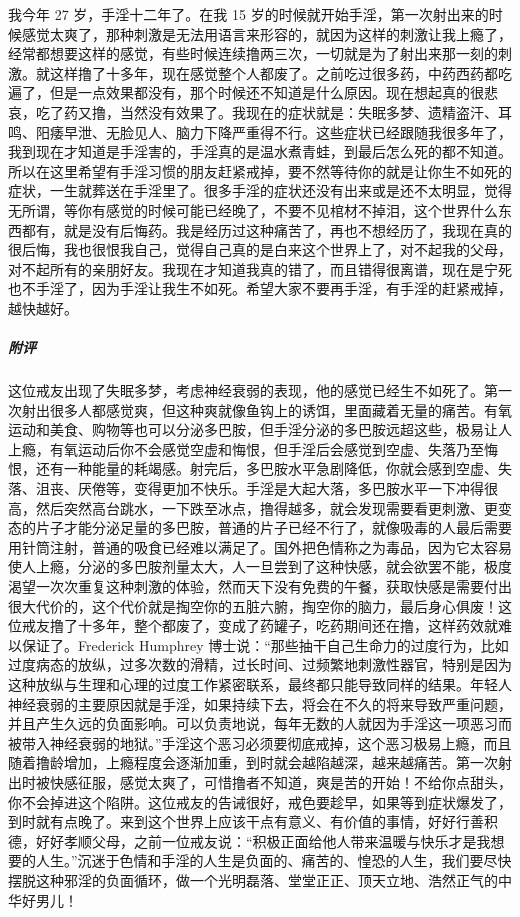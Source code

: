 \begin{case}
    我今年 27 岁，手淫十二年了。在我 15 岁的时候就开始手淫，第一次射出来的时候感觉太爽了，那种刺激是无法用语言来形容的，就因为这样的刺激让我上瘾了，经常都想要这样的感觉，有些时候连续撸两三次，一切就是为了射出来那一刻的刺激。就这样撸了十多年，现在感觉整个人都废了。之前吃过很多药，中药西药都吃遍了，但是一点效果都没有，那个时候还不知道是什么原因。现在想起真的很悲哀，吃了药又撸，当然没有效果了。我现在的症状就是：失眠多梦、遗精盗汗、耳鸣、阳痿早泄、无脸见人、脑力下降严重得不行。这些症状已经跟随我很多年了，我到现在才知道是手淫害的，手淫真的是温水煮青蛙，到最后怎么死的都不知道。所以在这里希望有手淫习惯的朋友赶紧戒掉，要不然等待你的就是让你生不如死的症状，一生就葬送在手淫里了。很多手淫的症状还没有出来或是还不太明显，觉得无所谓，等你有感觉的时候可能已经晚了，不要不见棺材不掉泪，这个世界什么东西都有，就是没有后悔药。我是经历过这种痛苦了，再也不想经历了，我现在真的很后悔，我也很恨我自己，觉得自己真的是白来这个世界上了，对不起我的父母，对不起所有的亲朋好友。我现在才知道我真的错了，而且错得很离谱，现在是宁死也不手淫了，因为手淫让我生不如死。希望大家不要再手淫，有手淫的赶紧戒掉，越快越好。
    \subparagraph{附评} 这位戒友出现了失眠多梦，考虑神经衰弱的表现，他的感觉已经生不如死了。第一次射出很多人都感觉爽，但这种爽就像鱼钩上的诱饵，里面藏着无量的痛苦。有氧运动和美食、购物等也可以分泌多巴胺，但手淫分泌的多巴胺远超这些，极易让人上瘾，有氧运动后你不会感觉空虚和悔恨，但手淫后会感觉到空虚、失落乃至悔恨，还有一种能量的耗竭感。射完后，多巴胺水平急剧降低，你就会感到空虚、失落、沮丧、厌倦等，变得更加不快乐。手淫是大起大落，多巴胺水平一下冲得很高，然后突然高台跳水，一下跌至冰点，撸得越多，就会发现需要看更刺激、更变态的片子才能分泌足量的多巴胺，普通的片子已经不行了，就像吸毒的人最后需要用针筒注射，普通的吸食已经难以满足了。国外把色情称之为毒品，因为它太容易使人上瘾，分泌的多巴胺剂量太大，人一旦尝到了这种快感，就会欲罢不能，极度渴望一次次重复这种刺激的体验，然而天下没有免费的午餐，获取快感是需要付出很大代价的，这个代价就是掏空你的五脏六腑，掏空你的脑力，最后身心俱废！这位戒友撸了十多年，整个都废了，变成了药罐子，吃药期间还在撸，这样药效就难以保证了。Frederick Humphrey 博士说：“那些抽干自己生命力的过度行为，比如过度病态的放纵，过多次数的滑精，过长时间、过频繁地刺激性器官，特别是因为这种放纵与生理和心理的过度工作紧密联系，最终都只能导致同样的结果。年轻人神经衰弱的主要原因就是手淫，如果持续下去，将会在不久的将来导致严重问题，并且产生久远的负面影响。可以负责地说，每年无数的人就因为手淫这一项恶习而被带入神经衰弱的地狱。”手淫这个恶习必须要彻底戒掉，这个恶习极易上瘾，而且随着撸龄增加，上瘾程度会逐渐加重，到时就会越陷越深，越来越痛苦。第一次射出时被快感征服，感觉太爽了，可惜撸者不知道，爽是苦的开始！不给你点甜头，你不会掉进这个陷阱。这位戒友的告诫很好，戒色要趁早，如果等到症状爆发了，到时就有点晚了。来到这个世界上应该干点有意义、有价值的事情，好好行善积德，好好孝顺父母，之前一位戒友说：“积极正面给他人带来温暖与快乐才是我想要的人生。”沉迷于色情和手淫的人生是负面的、痛苦的、惶恐的人生，我们要尽快摆脱这种邪淫的负面循环，做一个光明磊落、堂堂正正、顶天立地、浩然正气的中华好男儿！
\end{case}

